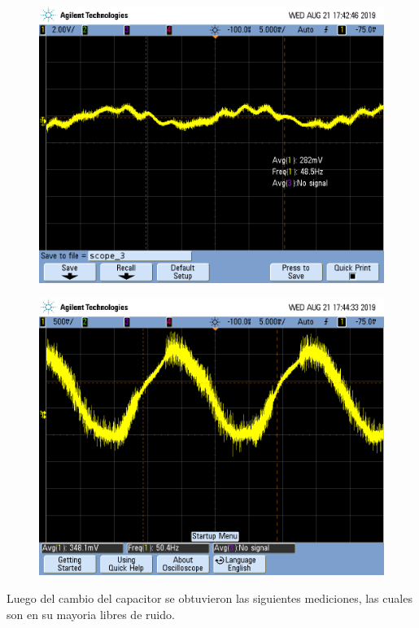 \documentclass[a4paper]{article}
\begin{document}
\begin{figure}[H]
\centering
\begin{minipage}{.5\textwidth}
  \centering
  \includegraphics[width=.99\linewidth]{imagenes/RS2CORTO.png}
  \label{fig:ib+TL}
\end{minipage}%
\begin{minipage}{.5\textwidth}
  \centering
  \includegraphics[width=.99\linewidth]{imagenes/RS1CORTO.png}
  \label{fig:ib-TL}
\end{minipage}
\end{figure}
Luego del cambio del capacitor  se obtuvieron las siguientes mediciones, las cuales son en su mayoria libres de ruido.
\end{document}
